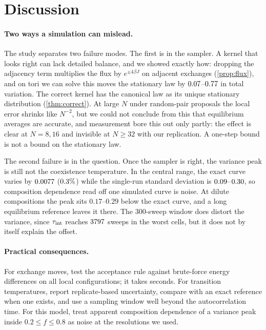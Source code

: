 \section{Discussion}\label{sec:discussion}
\paragraph{Two ways a simulation can mislead.} The study separates two failure modes. The first is in the sampler. A kernel that looks right can lack detailed balance, and we showed exactly how: dropping the adjacency term multiplies the flux by $e^{\pm4\beta J}$ on adjacent exchanges (\cref{prop:flux}), and on tori we can solve this moves the stationary law by $0.07$--$0.77$ in total variation. The correct kernel has the canonical law as its unique stationary distribution (\cref{thm:correct}). At large $N$ under random-pair proposals the local error shrinks like $N^{-2}$, but we could not conclude from this that equilibrium averages are accurate, and measurement bore this out only partly: the effect is clear at $N=8,16$ and invisible at $N\ge32$ with our replication. A one-step bound is not a bound on the stationary law.

The second failure is in the question. Once the sampler is right, the variance peak is still not the coexistence temperature. In the central range, the exact curve varies by $0.0077$ ($0.3\%$) while the single-run standard deviation is $0.09$--$0.30$, so composition dependence read off one simulated curve is noise. At dilute compositions the peak sits $0.17$--$0.29$ below the exact curve, and a long equilibrium reference leaves it there. The 300-sweep window does distort the variance, since $\tau_{\rm int}$ reaches $3797$ sweeps in the worst cells, but it does not by itself explain the offset.

\paragraph{Practical consequences.} For exchange moves, test the acceptance rule against brute-force energy differences on all local configurations; it takes seconds. For transition temperatures, report replicate-based uncertainty, compare with an exact reference when one exists, and use a sampling window well beyond the autocorrelation time. For this model, treat apparent composition dependence of a variance peak inside $0.2\le f\le0.8$ as noise at the resolutions we used.

